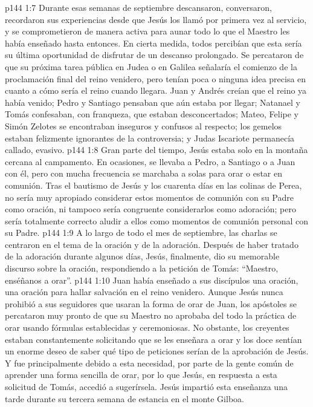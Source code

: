 \vs p144 1:7 Durante esas semanas de septiembre descansaron, conversaron, recordaron sus experiencias desde que Jesús los llamó por primera vez al servicio, y se comprometieron de manera activa para aunar todo lo que el Maestro les había enseñado hasta entonces. En cierta medida, todos percibían que esta sería su última oportunidad de disfrutar de un descanso prolongado. Se percataron de que su próxima tarea pública en Judea o en Galilea señalaría el comienzo de la proclamación final del reino venidero, pero tenían poca o ninguna idea precisa en cuanto a cómo sería el reino cuando llegara. Juan y Andrés creían que el reino ya había venido; Pedro y Santiago pensaban que aún estaba por llegar; Natanael y Tomás confesaban, con franqueza, que estaban desconcertados; Mateo, Felipe y Simón Zelotes se encontraban inseguros y confusos al respecto; los gemelos estaban felizmente ignorantes de la controversia; y Judas Iscariote permanecía callado, evasivo.
\vs p144 1:8 Gran parte del tiempo, Jesús estaba solo en la montaña cercana al campamento. En ocasiones, se llevaba a Pedro, a Santiago o a Juan con él, pero con mucha frecuencia se marchaba a solas para orar o estar en comunión. Tras el bautismo de Jesús y los cuarenta días en las colinas de Perea, no sería muy apropiado considerar estos momentos de comunión con su Padre como oración, ni tampoco sería congruente considerarlos como adoración; pero sería totalmente correcto aludir a ellos como momentos de comunión personal con su Padre.
\vs p144 1:9 A lo largo de todo el mes de septiembre, las charlas se centraron en el tema de la oración y de la adoración. Después de haber tratado de la adoración durante algunos días, Jesús, finalmente, dio su memorable discurso sobre la oración, respondiendo a la petición de Tomás: “Maestro, enséñanos a orar”.
\vs p144 1:10 Juan había enseñado a sus discípulos una oración, una oración para hallar salvación en el reino venidero. Aunque Jesús nunca prohibió a sus seguidores que usaran la forma de orar de Juan, los apóstoles se percataron muy pronto de que su Maestro no aprobaba del todo la práctica de orar usando fórmulas establecidas y ceremoniosas. No obstante, los creyentes estaban constantemente solicitando que se les enseñara a orar y los doce sentían un enorme deseo de saber qué tipo de peticiones serían de la aprobación de Jesús. Y fue principalmente debido a esta necesidad, por parte de la gente común de aprender una forma sencilla de orar, por lo que Jesús, en respuesta a esta solicitud de Tomás, accedió a sugerírsela. Jesús impartió esta enseñanza una tarde durante su tercera semana de estancia en el monte Gilboa.
